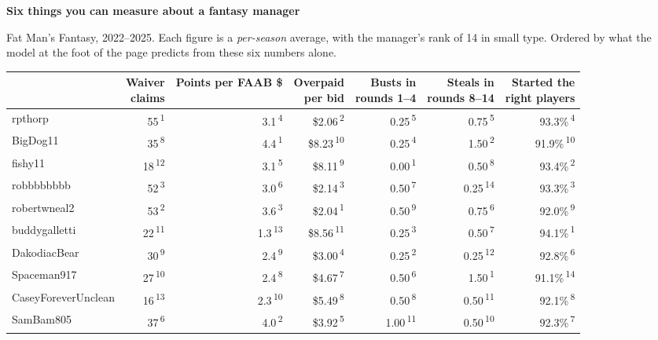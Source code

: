 \documentclass[10pt]{article}
\newcommand{\rk}[1]{\textsuperscript{\textcolor{muted}{\scriptsize #1}}}
\begin{document}
{\fontsize{16}{19}\selectfont\bfseries Six things you can measure about a fantasy manager}

\vspace{5pt}
{\color{muted}\large Fat Man's Fantasy, 2022--2025. Each figure is a
\emph{per-season} average, with the manager's rank of 14 in small type. Ordered by
what the model at the foot of the page predicts from these six numbers alone.}

\vspace{10pt}
\renewcommand{\arraystretch}{1.16}
\setlength{\tabcolsep}{8pt}
\begin{tabular}{l*{6}{r}}
\toprule
& \thead{Waiver\\claims} & \thead{Points per\\FAAB \$} & \thead{Overpaid\\per bid} & \thead{Busts in\\rounds 1--4} & \thead{Steals in\\rounds 8--14} & \thead{Started the\\right players} \\
\midrule
rpthorp & 55\,\rk{1} & 3.1\,\rk{4} & \$2.06\,\rk{2} & 0.25\,\rk{5} & 0.75\,\rk{5} & 93.3\%\,\rk{4} \\
BigDog11 & 35\,\rk{8} & 4.4\,\rk{1} & \$8.23\,\rk{10} & 0.25\,\rk{4} & 1.50\,\rk{2} & 91.9\%\,\rk{10} \\
fishy11 & 18\,\rk{12} & 3.1\,\rk{5} & \$8.11\,\rk{9} & 0.00\,\rk{1} & 0.50\,\rk{8} & 93.4\%\,\rk{2} \\
robbbbbbbb & 52\,\rk{3} & 3.0\,\rk{6} & \$2.14\,\rk{3} & 0.50\,\rk{7} & 0.25\,\rk{14} & 93.3\%\,\rk{3} \\
robertwneal2 & 53\,\rk{2} & 3.6\,\rk{3} & \$2.04\,\rk{1} & 0.50\,\rk{9} & 0.75\,\rk{6} & 92.0\%\,\rk{9} \\
buddygalletti & 22\,\rk{11} & 1.3\,\rk{13} & \$8.56\,\rk{11} & 0.25\,\rk{3} & 0.50\,\rk{7} & 94.1\%\,\rk{1} \\
DakodiacBear & 30\,\rk{9} & 2.4\,\rk{9} & \$3.00\,\rk{4} & 0.25\,\rk{2} & 0.25\,\rk{12} & 92.8\%\,\rk{6} \\
Spaceman917 & 27\,\rk{10} & 2.4\,\rk{8} & \$4.67\,\rk{7} & 0.50\,\rk{6} & 1.50\,\rk{1} & 91.1\%\,\rk{14} \\
CaseyForeverUnclean & 16\,\rk{13} & 2.3\,\rk{10} & \$5.49\,\rk{8} & 0.50\,\rk{8} & 0.50\,\rk{11} & 92.1\%\,\rk{8} \\
SamBam805 & 37\,\rk{6} & 4.0\,\rk{2} & \$3.92\,\rk{5} & 1.00\,\rk{11} & 0.50\,\rk{10} & 92.3\%\,\rk{7} \\

\end{tabular}
\end{document}
